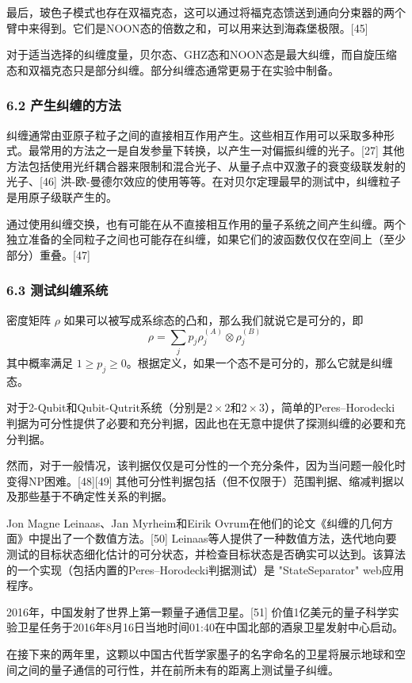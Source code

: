 最后，玻色子模式也存在双福克态，这可以通过将福克态馈送到通向分束器的两个臂中来得到。它们是NOON态的倍数之和，可以用来达到海森堡极限。[45]

对于适当选择的纠缠度量，贝尔态、GHZ态和NOON态是最大纠缠，而自旋压缩态和双福克态只是部分纠缠。部分纠缠态通常更易于在实验中制备。

\subsubsection{6.2 产生纠缠的方法}
纠缠通常由亚原子粒子之间的直接相互作用产生。这些相互作用可以采取多种形式。最常用的方法之一是自发参量下转换，以产生一对偏振纠缠的光子。[27] 其他方法包括使用光纤耦合器来限制和混合光子、从量子点中双激子的衰变级联发射的光子、[46] 洪-欧-曼德尔效应的使用等等。在对贝尔定理最早的测试中，纠缠粒子是用原子级联产生的。

通过使用纠缠交换，也有可能在从不直接相互作用的量子系统之间产生纠缠。两个独立准备的全同粒子之间也可能存在纠缠，如果它们的波函数仅仅在空间上（至少部分）重叠。[47]

\subsubsection{6.3 测试纠缠系统}
密度矩阵 $\rho$ 如果可以被写成系综态的凸和，那么我们就说它是可分的，即
$$\rho = \sum_j p_j \rho_j^{(A)} \otimes \rho_j^{(B)}~$$
其中概率满足 $1 \geq p_{j}\geq 0$。根据定义，如果一个态不是可分的，那么它就是纠缠态。

对于2-Qubit和Qubit-Qutrit系统（分别是$2\times2$和$2\times3$），简单的Peres–Horodecki判据为可分性提供了必要和充分判据，因此也在无意中提供了探测纠缠的必要和充分判据。

然而，对于一般情况，该判据仅仅是可分性的一个充分条件，因为当问题一般化时变得NP困难。[48][49] 其他可分性判据包括（但不仅限于）范围判据、缩减判据以及那些基于不确定性关系的判据。

Jon Magne Leinaas、Jan Myrheim和Eirik Ovrum在他们的论文《纠缠的几何方面》中提出了一个数值方法。[50] Leinaas等人提供了一种数值方法，迭代地向要测试的目标状态细化估计的可分状态，并检查目标状态是否确实可以达到。该算法的一个实现（包括内置的Peres–Horodecki判据测试）是 "StateSeparator" web应用程序。

2016年，中国发射了世界上第一颗量子通信卫星。[51] 价值1亿美元的量子科学实验卫星任务于2016年8月16日当地时间01:40在中国北部的酒泉卫星发射中心启动。

在接下来的两年里，这颗以中国古代哲学家墨子的名字命名的卫星将展示地球和空间之间的量子通信的可行性，并在前所未有的距离上测试量子纠缠。

